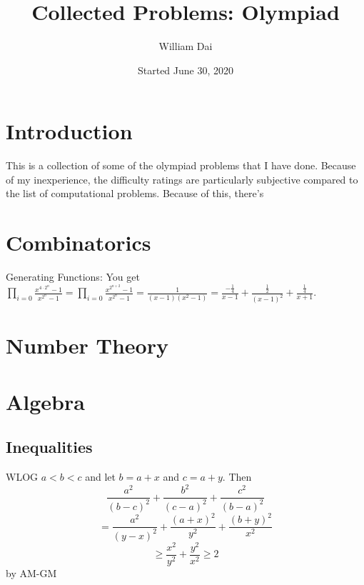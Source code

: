 \documentclass[11pt]{article}
\title{Collected Problems: Olympiad}
\author{William Dai}
\date{Started June 30, 2020}
\begin{document}
\maketitle

\section{Introduction}
This is a collection of some of the olympiad problems that I have done. Because of my inexperience, the difficulty ratings are particularly subjective compared to the list of computational problems. Because of this, there\rq{s}
\section{Combinatorics}

\begin{sol} Generating Functions: You get $\prod_{i=0} \frac{x^{4\cdot 2^{n}}-1}{x^{2^n}-1}= \prod_{i=0} \frac{x^{2^{n+2}}-1}{x^{2^n}-1}=\frac{1}{(x-1)(x^2-1)}=\frac{-\frac{1}{4}}{x-1}+\frac{\frac{1}{2}}{(x-1)^2}+\frac{\frac{1}{4}}{x+1}.$
\end{sol}


\setcounter{problem}{0}
\section{Number Theory}

\setcounter{problem}{0}
\section{Algebra}

\subsection{Inequalities}

\begin{sol} WLOG $a<b<c$ and let $b=a+x$ and $c=a+y$. Then
$$\frac{a^2}{(b-c)^2}+\frac{b^2}{(c-a)^2}+\frac{c^2}{(b-a)^2}$$
$$=\frac{a^2}{(y-x)^2} + \frac{(a+x)^2}{y^2}+\frac{(b+y)^2}{x^2}$$
$$\ge \frac{x^2}{y^2}+\frac{y^2}{x^2}\ge 2$$
by AM-GM
\end{sol}
\end{document}
